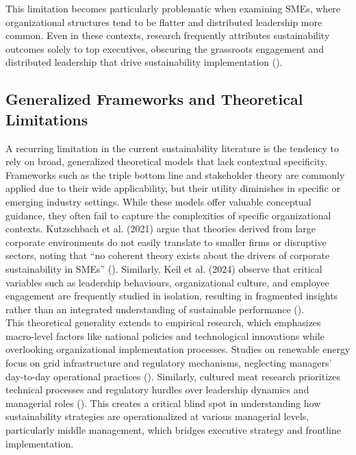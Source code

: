 	This limitation becomes particularly problematic when examining SMEs, where organizational structures tend to be flatter and distributed leadership more common. Even in these contexts, research frequently attributes sustainability outcomes solely to top executives, obscuring the grassroots engagement and distributed leadership that drive sustainability implementation (\textcite{birkinshaw2010}). \\
	
	\subsection{Generalized Frameworks and Theoretical Limitations}
	A recurring limitation in the current sustainability literature is the tendency to rely on broad, generalized theoretical models that lack contextual specificity. Frameworks such as the triple bottom line and stakeholder theory are commonly applied due to their wide applicability, but their utility diminishes in specific or emerging industry settings. While these models offer valuable conceptual guidance, they often fail to capture the complexities of specific organizational contexts. Kutzschbach et al. (2021) argue that theories derived from large corporate environments do not easily translate to smaller firms or disruptive sectors, noting that “no coherent theory exists about the drivers of corporate sustainability in SMEs” (\textcite{kutzschbach2021a}). Similarly, Keil et al. (2024) observe that critical variables such as leadership behaviours, organizational culture, and employee engagement are frequently studied in isolation, resulting in fragmented insights rather than an integrated understanding of sustainable performance (\textcite{keil2024a}). \\
	
	This theoretical generality extends to empirical research, which emphasizes macro-level factors like national policies and technological innovations while overlooking organizational implementation processes. Studies on renewable energy focus on grid infrastructure and regulatory mechanisms, neglecting managers’ day-to-day operational practices (\textcite{IRENA2020}). Similarly, cultured meat research prioritizes technical processes and regulatory hurdles over leadership dynamics and managerial roles (\textcite{Bryant2020}). This creates a critical blind spot in understanding how sustainability strategies are operationalized at various managerial levels, particularly middle management, which bridges executive strategy and frontline implementation. \\
	
